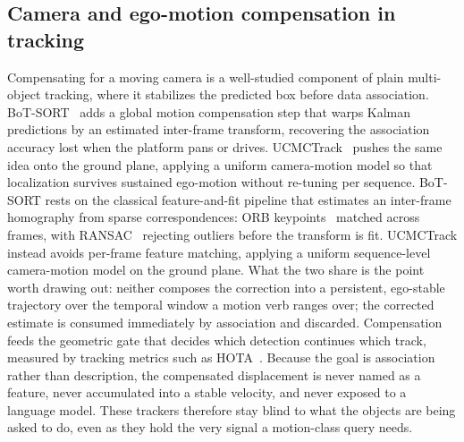 \documentclass[sigconf,review,anonymous]{acmart}
\begin{document}
\subsection{Camera and ego-motion compensation in tracking}
Compensating for a moving camera is a well-studied component of plain multi-object tracking, where it stabilizes the predicted box before data association. BoT-SORT~\cite{botsort} adds a global motion compensation step that warps Kalman predictions by an estimated inter-frame transform, recovering the association accuracy lost when the platform pans or drives. UCMCTrack~\cite{ucmctrack} pushes the same idea onto the ground plane, applying a uniform camera-motion model so that localization survives sustained ego-motion without re-tuning per sequence. BoT-SORT rests on the classical feature-and-fit pipeline that estimates an inter-frame homography from sparse correspondences: ORB keypoints~\cite{orb} matched across frames, with RANSAC~\cite{ransac} rejecting outliers before the transform is fit. UCMCTrack instead avoids per-frame feature matching, applying a uniform sequence-level camera-motion model on the ground plane. What the two share is the point worth drawing out: neither composes the correction into a persistent, ego-stable trajectory over the temporal window a motion verb ranges over; the corrected estimate is consumed immediately by association and discarded. Compensation feeds the geometric gate that decides which detection continues which track, measured by tracking metrics such as HOTA~\cite{hota}. Because the goal is association rather than description, the compensated displacement is never named as a feature, never accumulated into a stable velocity, and never exposed to a language model. These trackers therefore stay blind to what the objects are being asked to do, even as they hold the very signal a motion-class query needs.
\end{document}
